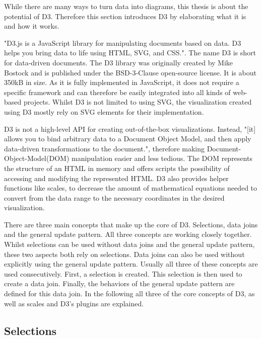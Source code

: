 While there are many ways to turn data into diagrams, this thesis is about the potential of D3. Therefore this section introduces D3 by elaborating what it is and how it works.

"D3.js is a JavaScript library for manipulating documents based on data. D3 helps you bring data to life using HTML, SVG, and CSS."\cite{d3js}. The name D3 is short for data-driven documents. The D3 library was originally created by Mike Bostock and is published under the BSD-3-Clause open-source license. It is about 350kB in size. As it is fully implemented in JavaScript, it does not require a specific framework and can therefore be easily integrated into all kinds of web-based projects. Whilst D3 is not limited to using SVG, the visualization created using D3 mostly rely on SVG elements for their implementation.

D3 is not a high-level API for creating out-of-the-box visualizations. Instead, "[it] allows you to bind arbitrary data to a Document Object Model, and then apply data-driven transformations to the document."\cite{d3js}, therefore making Document-Object-Model(DOM) manipulation easier and less tedious. The DOM represents the structure of an HTML in memory and offers scripts the possibility of accessing and modifying the represented HTML. D3 also provides helper functions like scales, to decrease the amount of mathematical equations needed to convert from the data range to the necessary coordinates in the desired visualization.

There are three main concepts that make up the core of D3. Selections, data joins and the general update pattern. All three concepts are working closely together. Whilst selections can be used without data joins and the general update pattern, these two aspects both rely on selections. Data joins can also be used without explicitly using the general update pattern. Usually all three of these concepts are used consecutively. First, a selection is created. This selection is then used to create a data join. Finally, the behaviors of the general update pattern are defined for this data join.
In the following all three of the core concepts of D3, as well as scales and D3's plugins are explained.


\subsection{Selections}

